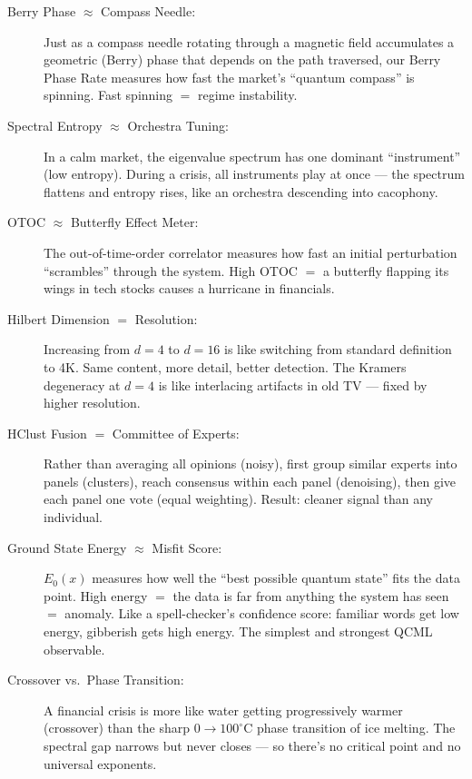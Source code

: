 \documentclass[11pt,a4paper]{article}
\begin{document}
\begin{description}
\item[Berry Phase $\approx$ Compass Needle:] Just as a compass needle rotating through a magnetic field accumulates a geometric (Berry) phase that depends on the path traversed, our Berry Phase Rate measures how fast the market's ``quantum compass'' is spinning. Fast spinning $=$ regime instability.

\item[Spectral Entropy $\approx$ Orchestra Tuning:] In a calm market, the eigenvalue spectrum has one dominant ``instrument'' (low entropy). During a crisis, all instruments play at once --- the spectrum flattens and entropy rises, like an orchestra descending into cacophony.

\item[OTOC $\approx$ Butterfly Effect Meter:] The out-of-time-order correlator measures how fast an initial perturbation ``scrambles'' through the system. High OTOC $=$ a butterfly flapping its wings in tech stocks causes a hurricane in financials.

\item[Hilbert Dimension $=$ Resolution:] Increasing from $d=4$ to $d=16$ is like switching from standard definition to 4K. Same content, more detail, better detection. The Kramers degeneracy at $d=4$ is like interlacing artifacts in old TV --- fixed by higher resolution.

\item[HClust Fusion $=$ Committee of Experts:] Rather than averaging all opinions (noisy), first group similar experts into panels (clusters), reach consensus within each panel (denoising), then give each panel one vote (equal weighting). Result: cleaner signal than any individual.

\item[Ground State Energy $\approx$ Misfit Score:] $E_0(x)$ measures how well the ``best possible quantum state'' fits the data point. High energy $=$ the data is far from anything the system has seen $=$ anomaly. Like a spell-checker's confidence score: familiar words get low energy, gibberish gets high energy. The simplest and strongest QCML observable.

\item[Crossover vs.\ Phase Transition:] A financial crisis is more like water getting progressively warmer (crossover) than the sharp $0 \to 100^\circ$C phase transition of ice melting. The spectral gap narrows but never closes --- so there's no critical point and no universal exponents.
\end{description}
\end{document}
